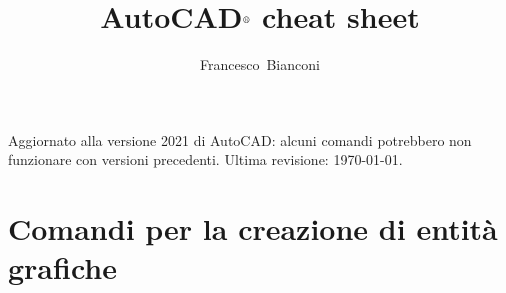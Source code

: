 \documentclass[..]{../IEEEphot}
\begin{document}
\title{AutoCAD$^{\text{\textregistered}}$ cheat sheet}

\author{Francesco~Bianconi}


\maketitle
%
%
\thispagestyle{empty}

\vspace{-1.0cm}
\noindent Aggiornato alla versione 2021 di AutoCAD: alcuni comandi potrebbero non funzionare con versioni precedenti. Ultima revisione: \today.

\tableofcontents

\clearpage

\section{Comandi per la creazione di entità grafiche}
\end{document}
